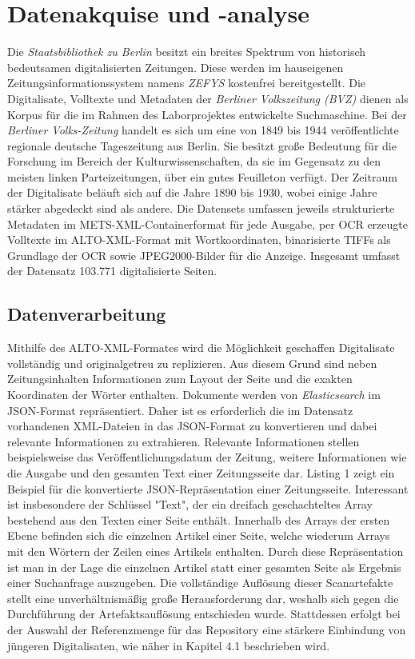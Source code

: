 \documentclass[11pt,a4paper, halfparskip]{scrartcl}
\begin{document}
\section{Datenakquise und -analyse}

Die \textit{Staatsbibliothek zu Berlin} besitzt ein breites Spektrum von historisch bedeutsamen digitalisierten Zeitungen.
Diese werden im hauseigenen Zeitungsinformationssystem namens \textit{ZEFYS} kostenfrei bereitgestellt.
Die Digitalisate, Volltexte und Metadaten der \textit{Berliner Volkszeitung (BVZ)} dienen als Korpus für die im Rahmen des Laborprojektes entwickelte Suchmaschine.
Bei der \textit{Berliner Volks-Zeitung} handelt es sich um eine von 1849 bis 1944 veröffentlichte regionale deutsche Tageszeitung aus Berlin.
Sie besitzt große Bedeutung für die Forschung im Bereich der Kulturwissenschaften, da sie im Gegensatz zu den meisten linken Parteizeitungen, über ein gutes Feuilleton verfügt.
Der Zeitraum der Digitalisate beläuft sich auf die Jahre 1890 bis 1930, wobei einige Jahre stärker abgedeckt sind als andere.
Die Datensets umfassen jeweils strukturierte Metadaten im METS-XML-Containerformat für jede Ausgabe, per OCR erzeugte Volltexte im ALTO-XML-Format mit Wortkoordinaten, binarisierte TIFFs als Grundlage der OCR sowie JPEG2000-Bilder für die Anzeige.
Insgesamt umfasst der Datensatz 103.771 digitalisierte Seiten.

\subsection{Datenverarbeitung}

Mithilfe des ALTO-XML-Formates wird die Möglichkeit geschaffen Digitalisate vollständig und originalgetreu zu replizieren. 
Aus diesem Grund sind neben Zeitungsinhalten Informationen zum Layout der Seite und die exakten Koordinaten der Wörter enthalten.
Dokumente werden von \textit{Elasticsearch} im JSON-Format repräsentiert.
Daher ist es erforderlich die im Datensatz vorhandenen XML-Dateien in das JSON-Format zu konvertieren und dabei relevante Informationen zu extrahieren.
Relevante Informationen stellen beispielsweise das Veröffentlichungsdatum der Zeitung, weitere Informationen wie die Ausgabe und den gesamten Text einer Zeitungsseite dar.
Listing 1 zeigt ein Beispiel für die konvertierte JSON-Repräsentation einer Zeitungsseite.
Interessant ist insbesondere der Schlüssel "Text", der ein dreifach geschachteltes Array bestehend aus den Texten einer Seite enthält.
Innerhalb des Arrays der ersten Ebene befinden sich die einzelnen Artikel einer Seite, welche wiederum Arrays mit den Wörtern der Zeilen eines Artikels enthalten.
Durch diese Repräsentation ist man in der Lage die einzelnen Artikel statt einer gesamten Seite als Ergebnis einer Suchanfrage auszugeben.
Die vollständige Auflösung dieser Scanartefakte stellt eine unverhältnismäßig große Herausforderung dar, weshalb sich gegen die Durchführung der Artefaktsauflösung entschieden wurde. 
Stattdessen erfolgt bei der Auswahl der Referenzmenge für das Repository eine stärkere Einbindung von jüngeren Digitalisaten, wie näher in Kapitel 4.1 beschrieben wird.
\end{document}
